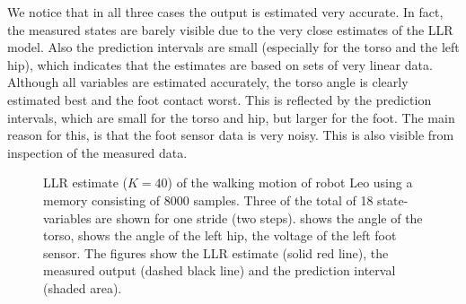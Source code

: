 We notice that in all three cases the output is estimated very accurate. In fact, the measured states are barely visible due to the very close estimates of the \ac{LLR} model. Also the prediction intervals are small (especially for the torso and the left hip), which indicates that the estimates are based on sets of very linear data. Although all variables are estimated accurately, the torso angle is clearly estimated best and the foot contact worst. This is reflected by the prediction intervals, which are small for the torso and hip, but larger for the foot. The main reason for this, is that the foot sensor data is very noisy. This is also visible from inspection of the measured data. 


\begin{figure}[htbp]
\centering
{}
\caption[\ac{LLR} estimate of Leo walking]{\ac{LLR} estimate ($K=40$) of the walking motion of robot Leo using a memory consisting of 8000 samples. Three of the total of 18 state-variables are shown for one stride (two steps).  shows the angle of the torso,  shows the angle of the left hip,  the voltage of the left foot sensor. The figures show the \ac{LLR} estimate (solid red line), the measured output (dashed black line) and the prediction interval (shaded area).}
\label{fig:LLR-LeoFullMemStep}
\end{figure}

